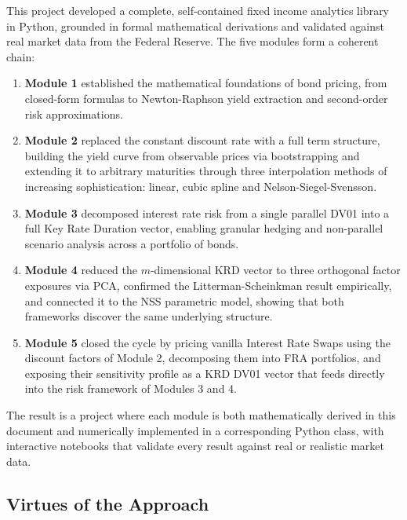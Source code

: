 \documentclass{article}
\theoremstyle{definition}  %
\theoremstyle{plain}  %
\numberwithin{definition}{section}
\numberwithin{proposition}{section}
\numberwithin{theorem}{section}
\numberwithin{equation}{section}
\begin{document}
This project developed a complete, self-contained fixed income analytics library in Python, grounded in formal mathematical derivations and validated against real market data from the Federal Reserve. The five modules form a coherent chain:
\begin{enumerate}
    \item \textbf{Module 1} established the mathematical foundations of bond pricing, from closed-form formulas to Newton-Raphson yield extraction and second-order risk approximations.
    
    \item \textbf{Module 2} replaced the constant discount rate with a full term structure, building the yield curve from observable prices via bootstrapping and extending it to arbitrary maturities through three interpolation methods of increasing sophistication: linear, cubic spline and Nelson-Siegel-Svensson.
    
    \item \textbf{Module 3} decomposed interest rate risk from a single parallel DV01 into a full Key Rate Duration vector, enabling granular hedging and non-parallel scenario analysis across a portfolio of bonds.
    
    \item \textbf{Module 4} reduced the $m$-dimensional KRD vector to three orthogonal factor exposures via PCA, confirmed the Litterman-Scheinkman result empirically, and connected it to the NSS parametric model, showing that both frameworks discover the same underlying structure.
    
    \item \textbf{Module 5} closed the cycle by pricing vanilla Interest Rate Swaps using the discount factors of Module 2, decomposing them into FRA portfolios, and exposing their sensitivity profile as a KRD DV01 vector that feeds directly into the risk framework of Modules 3 and 4.
\end{enumerate}

The result is a project where each module is both mathematically derived in this document and numerically implemented in a corresponding Python class, with interactive notebooks that validate every result against real or realistic market data.

\subsection*{Virtues of the Approach}
\end{document}

